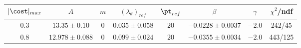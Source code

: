 \begin{tabular}{c|c|c|c|c|c|c|c}
$|\cost|_{max}$ & $A$ & $m$ & $(\lambda_\theta)_{ref}$ & ${\pt}_{ref}$ & $\beta$ & $\gamma$ & $\chi^2$/ndf \\
\hline
$0.3$ & $13.35\pm0.10$ & $0$ & $0.035\pm0.058$ & $20$ & $-0.0228\pm0.0037$ & $-2.0$ & 242/45 \\
$0.8$ & $12.978\pm0.088$ & $0$ & $0.099\pm0.024$ & $20$ & $-0.0355\pm0.0034$ & $-2.0$ & 443/125
\end{tabular}
